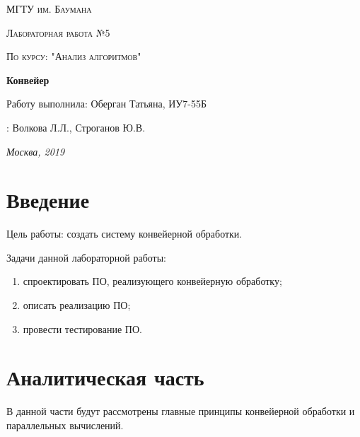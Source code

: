 \documentclass[12pt]{report}
\begin{document}
\begin{titlepage}
	\centering
	{\scshape\LARGE МГТУ им. Баумана \par}
	\vspace{3cm}
	{\scshape\Large Лабораторная работа №5\par}
	\vspace{0.5cm}	
	{\scshape\Large По курсу: "Анализ алгоритмов"\par}
	\vspace{1.5cm}
	{\huge\bfseries Конвейер \par}
	\vspace{2cm}
	\Large Работу выполнила: Оберган Татьяна, ИУ7-55Б\par
	\vspace{0.5cm}
	:  Волкова Л.Л., Строганов Ю.В.\par

	\vfill
	\large \textit {Москва, 2019} \par
\end{titlepage}

\tableofcontents

\newpage
\chapter*{Введение}
Цель работы: создать систему конвейерной обработки.

Задачи данной лабораторной работы:
\begin{enumerate}
        \item спроектировать ПО, реализующего конвейерную обработку;
        \item описать реализацию ПО;
        \item провести тестирование ПО.
\end{enumerate}



\chapter{Аналитическая часть}
В данной части будут рассмотрены главные принципы конвейерной обработки и параллельных вычислений.
\end{document}

